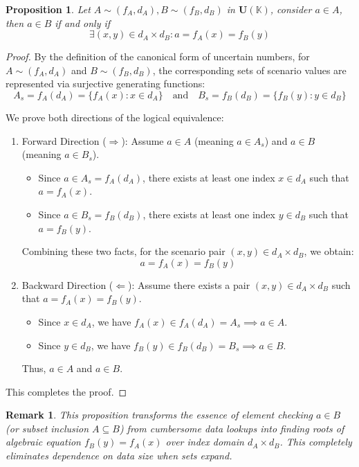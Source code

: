 \documentclass[a4paper,12pt,twoside]{memoir}
\newtheorem{proposition}{Proposition}[chapter]
\newtheorem{remark}{Remark}[chapter]
\newcommand{\tsbd}[1]{\mathbf{U}(\mathbb{#1})}
\begin{document}
	\begin{proposition}
		Let $A \sim (f_A,d_A), B \sim (f_B,d_B)$ in $\tsbd{K}$, consider $a \in A$, then $a \in B$ if and only if
		\[
		\exists (x,y) \in d_A \times d_B : a=f_A(x)=f_B(y)
		\]
	\end{proposition}
	\begin{proof}
		By the definition of the canonical form of uncertain numbers, for $A \sim (f_A, d_A)$ and $B \sim (f_B, d_B)$, the corresponding sets of scenario values are represented via surjective generating functions:
		\[
		A_s = f_A(d_A) = \{f_A(x) : x \in d_A\} \quad \text{and} \quad B_s = f_B(d_B) = \{f_B(y) : y \in d_B\}
		\]
		
		We prove both directions of the logical equivalence:
		\begin{enumerate}[leftmargin=*]
			\item Forward Direction ($\Rightarrow$):
			Assume $a \in A$ (meaning $a \in A_s$) and $a \in B$ (meaning $a \in B_s$).
			\begin{itemize}
				\item Since $a \in A_s = f_A(d_A)$, there exists at least one index $x \in d_A$ such that $a = f_A(x)$.
				\item Since $a \in B_s = f_B(d_B)$, there exists at least one index $y \in d_B$ such that $a = f_B(y)$.
			\end{itemize}
			Combining these two facts, for the scenario pair $(x, y) \in d_A \times d_B$, we obtain:
			\[
			a = f_A(x) = f_B(y)
			\]
			
			\item Backward Direction ($\Leftarrow$):
			Assume there exists a pair $(x, y) \in d_A \times d_B$ such that $a = f_A(x) = f_B(y)$.
			\begin{itemize}
				\item Since $x \in d_A$, we have $f_A(x) \in f_A(d_A) = A_s \implies a \in A$.
				\item Since $y \in d_B$, we have $f_B(y) \in f_B(d_B) = B_s \implies a \in B$.
			\end{itemize}
			Thus, $a \in A$ and $a \in B$.
		\end{enumerate}
		
		This completes the proof.
	\end{proof}
	\begin{remark}
		This proposition transforms the essence of element checking $a \in B$ (or subset inclusion $A \subseteq B$) from cumbersome data lookups into finding roots of algebraic equation $f_B(y) = f_A(x)$ over index domain $d_A \times d_B$. This completely eliminates dependence on data size when sets expand.
	\end{remark}
	
\end{document}
